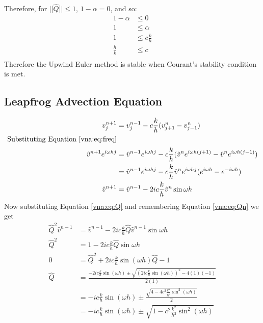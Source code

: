 Therefore, for $||\hat{Q}|| \leq 1$, $1-\alpha=0$, and so:
\begin{align*}
    1 - \alpha 	&\leq 0			\\
    1 		&\leq \alpha		\\
    1 		&\leq c \frac{k}{h}	\\
    \frac{h}{k}	&\leq c			\\
\end{align*}
Therefore the Upwind Euler method is stable when Courant's stability condition is met.
\subsection{Leapfrog Advection Equation}
\begin{align*}
    v_j^{n+1}	&= v_j^{n-1} - c\frac{k}{h}(v_{j+1}^n - v_{j-1}^n) 										\\
    \text{Substituting Equation \ref{vna:eq:freq}} 												\\
    \hat{v}^{n+1}e^{i\omega hj} &= \hat{v}^{n-1}e^{i\omega hj} 	- c\frac{k}{h} (\hat{v}^ne^{i\omega h(j+1)} - \hat{v}^ne^{i\omega h(j-1)})	\\
				&= \hat{v}^{n-1}e^{i\omega hj} 	- c\frac{k}{h} \hat{v}^{n}e^{i\omega hj} (e^{i\omega h} - e^{-i\omega h})	\\
    \hat{v}^{n+1}		&= \hat{v}^{n-1}		- 2 i c\frac{k}{h} \hat{v}^{n} \sin \omega h					\\
\end{align*}
Now substituting Equation \ref{vna:eq:Q} and remembering Equation \ref{vna:eq:Qn} we get
\begin{align*}
    \hat{Q}^2\hat{v}^{n-1}	&= \hat{v}^{n-1} - 2 i c\frac{k}{h} \hat{Q} \hat{v}^{n-1} \sin \omega h				\\
    \hat{Q}^2	&= 1 - 2 i c\frac{k}{h} \hat{Q} \sin \omega h									\\
    0 		&= \hat{Q}^2 + 2 i c\frac{k}{h} \sin( \omega h )\hat{Q} - 1							\\
    \hat{Q} 	& = \frac{-2 i c\frac{k}{h} \sin( \omega h ) \pm \sqrt{(2 i c\frac{k}{h} \sin( \omega h ))^2 - 4(1)(-1)}}{2(1)}	\\
		& = -i c\frac{k}{h} \sin( \omega h ) \pm \frac{ \sqrt{4 -4 c^2\frac{k^2}{h^2} \sin^2( \omega h )}}{2}		\\
		& = -i c\frac{k}{h} \sin( \omega h ) \pm \sqrt{1 -c^2\frac{k^2}{h^2} \sin^2( \omega h )}			\\
\end{align*}
